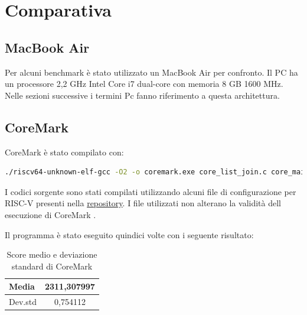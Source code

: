 \documentclass[12pt,a4paper]{report}
\begin{document}
\chapter{Comparativa}

\section*{MacBook Air}
\label{sec:MacBook}
Per alcuni benchmark è stato utilizzato un MacBook Air per confronto.  Il PC ha un processore 2,2 GHz Intel Core i7 dual-core con memoria 8 GB 1600 MHz. Nelle sezioni successive i termini Pc fanno riferimento a questa architettura.

\section{CoreMark}
CoreMark è stato compilato con:

\begin{lstlisting}[language=sh, caption = {compilazione CoreMark}, captionpos = b]
./riscv64-unknown-elf-gcc -O2 -o coremark.exe core_list_join.c core_main.c core_matrix.c core_state.c core_util.c simple/core_portme.c -DPERFORMANCE_RUN=1 -DITERATIONS=1000
\end{lstlisting}



I codici sorgente sono stati compilati utilizzando alcuni file di configurazione per RISC-V presenti nella \href{https://github.com/riscv-boom/riscv-coremark}{repository}\cite{CoreMarkWrapper}. I file utilizzati non alterano la validità dell esecuzione di CoreMark
\cite{CoreMarkRepo}.

Il programma è stato eseguito quindici volte con i seguente risultato:

\begin{table}[ht]
\centering
\begin{tabular}{|l|c|}
\hline
Media   & 2311,307997 \\ \hline
Dev.std & 0,754112    \\ \hline
\end{tabular}
\caption{Score medio e deviazione standard di CoreMark}
\end{table}
\end{document}

